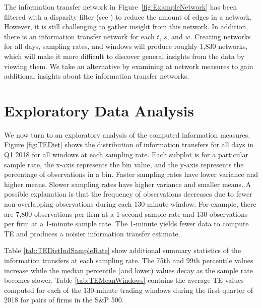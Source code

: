 The information transfer network in Figure~\ref{fig:ExampleNetwork} has been filtered with a disparity filter (see \cite{Serrano}) to reduce the amount of edges in a network.  However, it is still challenging to gather insight from this network.  In addition, there is an information transfer network for each $t$,  $s$,  and $w$. Creating networks for all days,  sampling rates, and windows will produce roughly 1,830 networks, which will make it more difficult to discover general insights from the data by viewing them.  We take an alternative by examining at network measures to gain additional insights about the information transfer networks.


\section{Exploratory Data Analysis}

We now turn to an exploratory analysis of the computed information measures. Figure \ref{fig:TEDist} shows the distribution of information transfers for all days in Q1 2018 for all windows at each sampling rate.   Each subplot is for a particular sample rate,  the x-axis represents the bin value,  and the y-axis represents the percentage of observations in a bin.  Faster sampling rates have lower variance and higher means.  Slower sampling rates have higher variance and smaller means.  A possible explanation is that the frequency of observations decreases due to fewer non-overlapping observations during each 130-minute window.   For example,  there are 7,800 observations per firm at a 1-second sample rate and 130 observations per firm at a 1-minute sample rate. The 1-minute yields fewer data to compute TE and produces a noisier information transfer estimate. 

Table \ref{tab:TEDistIndSampleRate} show additional summary statistics of the information transfers at  each sampling rate.  The 75th and 99th percentile values increase while the median percentile (and lower) values decay as the sample rate becomes slower.  Table \ref{tab:TEMeanWindows} contains the average TE values computed for each of the 130-minute trading windows during the first quarter of 2018 for pairs of firms in the S\&P 500.  

